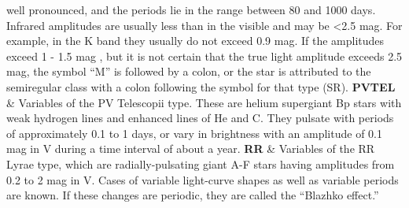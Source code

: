 \begin{longtabu}
well pronounced, and the periods lie in the range between 80 and 1000
days. Infrared amplitudes are usually less than in the visible and may
be \textless{}2.5 mag. For example, in the K band they usually do not
exceed 0.9 mag. If the amplitudes exceed 1 - 1.5 mag , but it is not
certain that the true light amplitude exceeds 2.5 mag, the symbol ``M''
is followed by a colon, or the star is attributed to the semiregular
class with a colon following the symbol for that type
(SR).\tabularnewline
\textbf{PVTEL} & Variables of the PV Telescopii type. These are helium
supergiant Bp stars with weak hydrogen lines and enhanced lines of He
and C. They pulsate with periods of approximately 0.1 to 1 days, or vary
in brightness with an amplitude of 0.1 mag in V during a time interval
of about a year.\tabularnewline
\textbf{RR} & Variables of the RR Lyrae type, which are
radially-pulsating giant A-F stars having amplitudes from 0.2 to 2 mag
in V. Cases of variable light-curve shapes as well as variable periods
are known. If these changes are periodic, they are called the ``Blazhko
effect.''


\end{longtabu}
